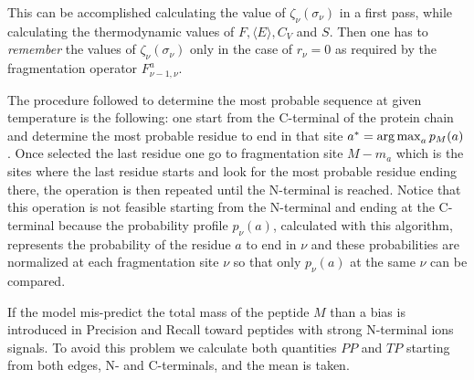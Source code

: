 This can be accomplished calculating the value of $\zeta_\nu(\sigma_\nu)$ in a
first pass, while calculating the thermodynamic values of $F, \langle
E\rangle, C_V$ and $S$.
Then one has to \emph{remember} the values of $\zeta_\nu(\sigma_\nu)$ only in
the case of $r_\nu=0$ as required by the fragmentation operator
$F^{a}_{\nu-1,\nu}$.

The procedure followed to determine the most probable sequence at given
temperature is the following: one start from the C-terminal of the protein chain
and determine the most probable residue to end in that site $a^*=\operatorname*{arg\,max}_a
p_M(a)$. Once selected the last residue one go to fragmentation site $M-m_a$ which
is the sites where the last residue starts and look for the most probable
residue ending there, the operation is then repeated until the N-terminal is
reached.
Notice that this operation is not feasible starting from
the N-terminal and ending at the C-terminal because the probability profile
$p_\nu(a)$, calculated with this algorithm, represents the
probability of the residue $a$ to end in $\nu$ and these probabilities are normalized at
each fragmentation site $\nu$ so that only $p_\nu(a)$ at the same $\nu$ can be compared.

If the model mis-predict the total mass of the peptide $M$ than a bias is
introduced in Precision and Recall toward peptides with strong N-terminal ions
signals. To avoid this problem we
calculate both quantities $PP$ and $TP$ starting from both edges, N- and
C-terminals, and the mean is taken.
